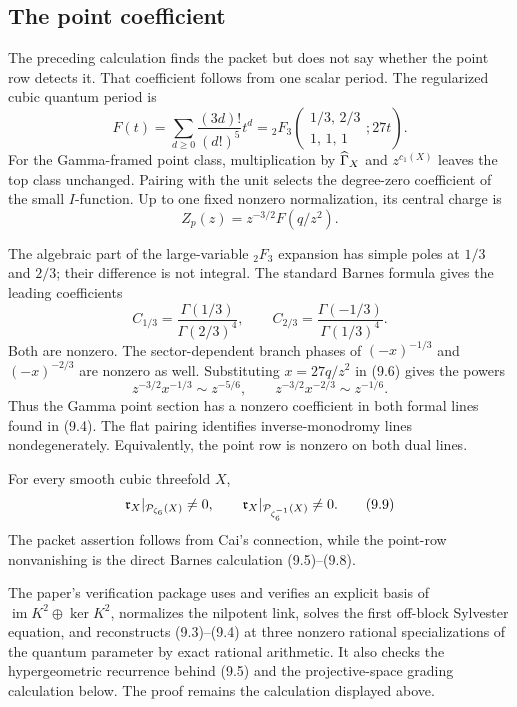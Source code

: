 \subsection{The point coefficient}

The preceding calculation finds the packet but does not say whether the
point row detects it.  That coefficient follows from one scalar period.  The
regularized cubic quantum period is
\[
 F(t)=\sum_{d\geq0}\frac{(3d)!}{(d!)^5}t^d
 ={}_2F_3\!\left(
   \begin{matrix}1/3,\,2/3\\1,\,1,\,1\end{matrix};27t
 \right).                                                    \tag{9.5}
\]
For the Gamma-framed point class, multiplication by \(\widehat{\Gamma}_X\) and
\(z^{c_1(X)}\) leaves the top class unchanged.  Pairing with the unit selects
the degree-zero coefficient of the small \(I\)-function.  Up to one fixed
nonzero normalization, its central charge is
\[
 Z_p(z)=z^{-3/2}F(q/z^2).                                    \tag{9.6}
\]

The algebraic part of the large-variable \({}_2F_3\) expansion has simple
poles at \(1/3\) and \(2/3\); their difference is not integral.  The standard
Barnes formula \cite[Equations~16.11.2 and 16.11.8]{DLMF} gives the leading
coefficients
\[
 C_{1/3}=\frac{\Gamma(1/3)}{\Gamma(2/3)^4},
 \qquad
 C_{2/3}=\frac{\Gamma(-1/3)}{\Gamma(1/3)^4}.                 \tag{9.7}
\]
Both are nonzero.  The sector-dependent branch phases of
\((-x)^{-1/3}\) and \((-x)^{-2/3}\) are nonzero as well.  Substituting
\(x=27q/z^2\) in (9.6) gives the powers
\[
 z^{-3/2}x^{-1/3}\sim z^{-5/6},
 \qquad
 z^{-3/2}x^{-2/3}\sim z^{-1/6}.                             \tag{9.8}
\]
Thus the Gamma point section has a nonzero coefficient in both formal lines
found in (9.4).  The flat pairing identifies inverse-monodromy lines
nondegenerately.  Equivalently, the point row is nonzero on both dual lines.

\begin{proposition}
\label{prop:cubic-endpoint}
For every smooth cubic threefold \(X\),
\[
 \mathfrak r_X|_{\mathcal P_{\zeta_6}(X)}\ne0,
 \qquad
 \mathfrak r_X|_{\mathcal P_{\zeta_6^{-1}}(X)}\ne0.                     \tag{9.9}
\]
The packet assertion follows from Cai's connection, while the point-row
nonvanishing is the direct Barnes calculation (9.5)--(9.8).
\end{proposition}

\begin{remark}
The paper's verification package uses and verifies an explicit basis of
\(\operatorname{im}K^2\oplus\ker K^2\), normalizes the nilpotent link, solves
the first off-block Sylvester equation, and reconstructs (9.3)--(9.4) at
three nonzero rational specializations of the quantum parameter by exact
rational arithmetic.  It also checks the
hypergeometric recurrence behind (9.5) and the projective-space grading
calculation below.  The proof remains the calculation displayed above.
\end{remark}

